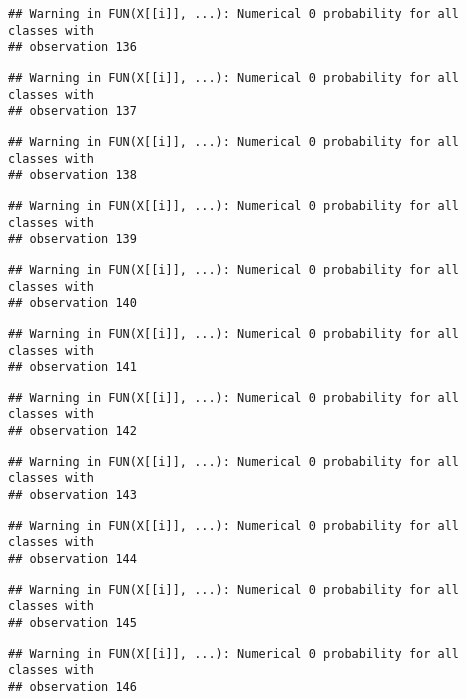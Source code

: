 \documentclass[
]{article}
\begin{document}
\begin{verbatim}
## Warning in FUN(X[[i]], ...): Numerical 0 probability for all classes with
## observation 136
\end{verbatim}

\begin{verbatim}
## Warning in FUN(X[[i]], ...): Numerical 0 probability for all classes with
## observation 137
\end{verbatim}

\begin{verbatim}
## Warning in FUN(X[[i]], ...): Numerical 0 probability for all classes with
## observation 138
\end{verbatim}

\begin{verbatim}
## Warning in FUN(X[[i]], ...): Numerical 0 probability for all classes with
## observation 139
\end{verbatim}

\begin{verbatim}
## Warning in FUN(X[[i]], ...): Numerical 0 probability for all classes with
## observation 140
\end{verbatim}

\begin{verbatim}
## Warning in FUN(X[[i]], ...): Numerical 0 probability for all classes with
## observation 141
\end{verbatim}

\begin{verbatim}
## Warning in FUN(X[[i]], ...): Numerical 0 probability for all classes with
## observation 142
\end{verbatim}

\begin{verbatim}
## Warning in FUN(X[[i]], ...): Numerical 0 probability for all classes with
## observation 143
\end{verbatim}

\begin{verbatim}
## Warning in FUN(X[[i]], ...): Numerical 0 probability for all classes with
## observation 144
\end{verbatim}

\begin{verbatim}
## Warning in FUN(X[[i]], ...): Numerical 0 probability for all classes with
## observation 145
\end{verbatim}

\begin{verbatim}
## Warning in FUN(X[[i]], ...): Numerical 0 probability for all classes with
## observation 146
\end{verbatim}
\end{document}
